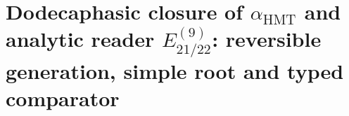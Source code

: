 \begin{HMTScientificOwnerSubordinated}

\end{HMTScientificOwnerSubordinated}
\begingroup
\let\HMTRecoveredOriginalPart\part
\let\part\section
\begin{HMTScientificOwnerSubordinated}


\end{HMTScientificOwnerSubordinated}
\let\part\HMTRecoveredOriginalPart
\endgroup

\HMTFlushCurrentChapter
\chapter{Dodecaphasic closure of \texorpdfstring{\(\alpha_{\mathrm{HMT}}\)}{alpha HMT} and analytic reader \texorpdfstring{\(E_{21/22}^{(9)}\)}{E21/22 of order 9}: reversible generation, simple root and typed comparator}%
\begingroup
\renewcommand{\chapter}[2][]{}%
%
\endgroup


\HMTFlushCurrentChapter
\chapter{Internal construction of \texorpdfstring{\(i=\sqrt{-1}\)}{i=sqrt(-1)} via the rotation operator \texorpdfstring{\(J\)}{J}: identity \texorpdfstring{\(J^2=-I\)}{J2=-I} and elliptic geometry of phase}%
\begingroup
\renewcommand{\chapter}[2][]{}%
%
\endgroup

